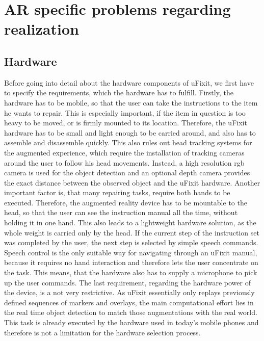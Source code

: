 
\chapter{AR specific problems regarding realization}

\section{Hardware}
\label{sec:hardware}

Before going into detail about the hardware components of uFixit, we first have to specify the requirements, which the hardware has to fulfill. Firstly, the hardware has to be mobile, so that the user can take the instructions to the item he wants to repair. This is especially important, if the item in question is too heavy to be moved, or is firmly mounted to its location. Therefore, the uFixit hardware has to be small and light enough to be carried around, and also has to assemble and disassemble quickly.
This also rules out head tracking systems for the augmented experience, which require the installation of tracking cameras around the user to follow his head movements. Instead, a high resolution rgb camera is used for the object detection and an optional depth camera provides the exact distance between the observed object and the uFixit hardware.
Another important factor is, that many repairing tasks, require both hands to be executed. Therefore, the augmented reality device has to be mountable to the head, so that the user can see the instruction manual all the time, without holding it in one hand. This also leads to a lightweight hardware solution, as the whole weight is carried only by the head.
If the current step of the instruction set was completed by the user, the next step is selected by simple speech commands. Speech control is the only suitable way for navigating through an uFixit manual, because it requires no hand interaction and therefore lets the user concentrate on the task. This means, that the hardware also has to supply a microphone to pick up the user commands.
The last requirement, regarding the hardware power of the device, is a not very restrictive. As uFixit essentially only replays previously defined sequences of markers and overlays, the main computational effort lies in the real time object detection to match those augmentations with the real world. This task is already executed by the hardware used in today’s mobile phones and therefore  is not a limitation for the hardware selection process.

